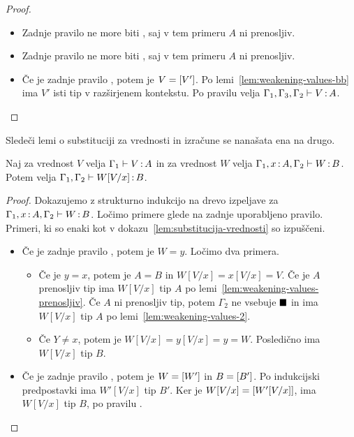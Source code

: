 \begin{proof}
\begin{itemize}
		\item Zadnje pravilo ne more biti , saj v tem primeru $A$ ni prenosljiv.
		
		\item Zadnje pravilo ne more biti , saj v tem primeru $A$ ni prenosljiv.
		
		\item Če je zadnje pravilo , potem je $V = [V']$.
		Po lemi~\ref{lem:weakening-values-bb} ima $V'$ isti tip v razširjenem kontekstu.
		Po pravilu  velja $\Gamma_1, \Gamma_3, \Gamma_2 \vdash V \mathinner{:} A$.
		
	\end{itemize}
\end{proof}

Sledeči lemi o substituciji za vrednosti in izračune se nanašata ena na drugo.

\begin{lema}\label{lem:substitucija-vrednosti-2}
	Naj za vrednost $V$ velja $\Gamma_1 \vdash V \mathinner{:} A$ in za vrednost $W$ velja $\Gamma_1, x \mathinner{:} A, \Gamma_2 \vdash W \mathinner{:} B$. Potem velja $\Gamma_1, \Gamma_2 \vdash W[V/x] \mathinner{:} B$.
\end{lema}

\begin{proof}
	Dokazujemo z strukturno indukcijo na drevo izpeljave za $\Gamma_1, x \mathinner{:} A, \Gamma_2 \vdash W \mathinner{:} B$.
	Ločimo primere glede na zadnje uporabljeno pravilo.
	Primeri, ki so enaki kot v dokazu~\ref{lem:substitucija-vrednosti} so izpuščeni.
	
	\begin{itemize}
		\item Če je zadnje pravilo , potem je $W = y$.
		Ločimo dva primera.
		\begin{itemize}
			\item Če je $y = x$, potem je $A = B$ in $W[V/x] = x[V/x] = V$. Če je $A$ prenosljiv tip ima $W[V/x]$ tip $A$ po lemi~\ref{lem:weakening-values-prenosljiv}. Če $A$ ni prenosljiv tip, potem $\Gamma_2$ ne vsebuje $\blacksquare$ in ima $W[V/x]$ tip $A$ po lemi~\ref{lem:weakening-values-2}.
			
			\item Če $Y \neq x$, potem je $W[V/x] = y[V/x] = y = W$. Posledično ima $W[V/x]$ tip $B$.
		\end{itemize}
		
		\item Če je zadnje pravilo , potem je $W=[W']$ in $B=[B']$. Po indukcijski predpostavki ima $W'[V/x]$ tip $B'$. Ker je $W[V/x] = [W'[V/x]]$, ima $W[V/x]$ tip $B$, po pravilu .
		
	\end{itemize}
\end{proof}

